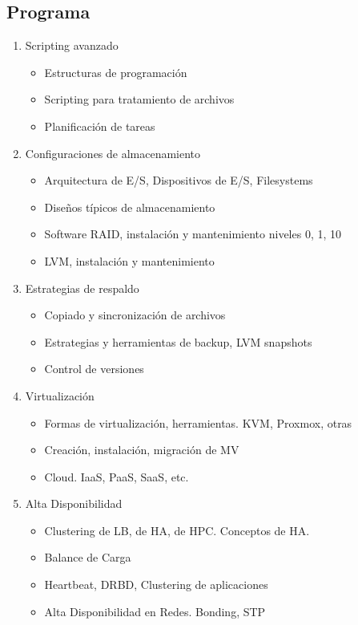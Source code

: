 \subsection {Programa}
\begin{enumerate}
\item Scripting avanzado
\begin{itemize}
	\item Estructuras de programación
	\item Scripting para tratamiento de archivos
	\item Planificación de tareas
\end{itemize}

\item Configuraciones de almacenamiento
\begin{itemize}
	\item Arquitectura de E/S, Dispositivos de E/S, Filesystems
	\item	Diseños típicos de almacenamiento
	\item	Software RAID, instalación y mantenimiento niveles 0, 1, 10
	\item	LVM, instalación y mantenimiento	 
\end{itemize}
	
\item Estrategias de respaldo
\begin{itemize}
	\item Copiado y sincronización de archivos
	\item Estrategias y herramientas de backup, LVM snapshots
	\item Control de versiones
\end{itemize}
\item Virtualización
\begin{itemize}
	\item Formas de virtualización, herramientas. KVM, Proxmox, otras
	\item Creación, instalación, migración de MV
	\item Cloud. IaaS, PaaS, SaaS, etc.
\end{itemize}
\item Alta Disponibilidad
\begin{itemize}
	\item Clustering de LB, de HA, de HPC. Conceptos de HA.
	\item Balance de Carga
	\item Heartbeat, DRBD, Clustering de aplicaciones
	\item Alta Disponibilidad en Redes. Bonding, STP
\end{itemize}
\end{enumerate}


